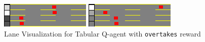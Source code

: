 \begin{figure}[H]
    \centering
    \begin{minipage}{0.48\textwidth}
        \centering
        \includegraphics[width=\linewidth]{plots/part1-e.1-lane_visualization_01_step_0420.png}
    \end{minipage}
    \hfill
    \begin{minipage}{0.48\textwidth}
        \centering
        \includegraphics[width=\linewidth]{plots/part1-e.1-lane_visualization_00_step_1000.png}
    \end{minipage}
    \caption{Lane Visualization for Tabular Q-agent with \texttt{overtakes} reward}
    \label{fig:part1-e.1-lane-visualization}
\end{figure}


